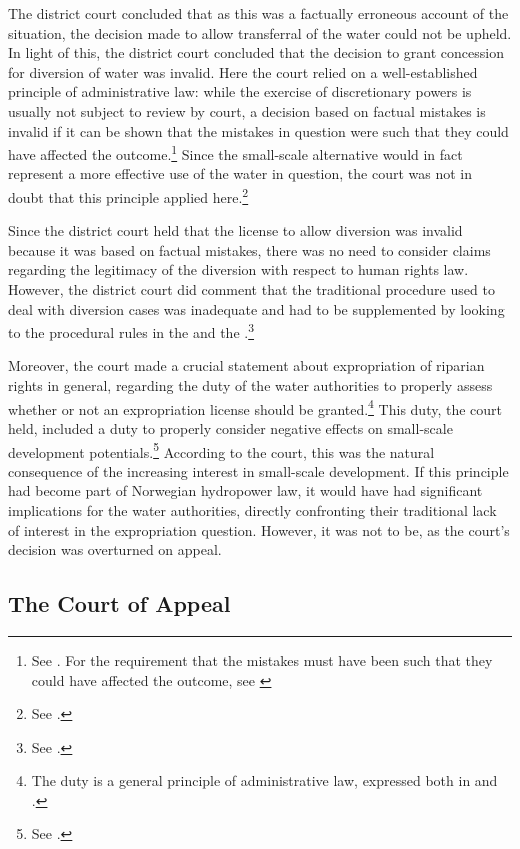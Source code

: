 The district court concluded that as this was a factually erroneous account of the situation, the decision made to allow transferral of the water could not be upheld. In light of this, the district court concluded that the decision to grant concession for diversion of water was invalid. Here the court relied on a well-established principle of administrative law: while the exercise of discretionary powers is usually not subject to review by court, a decision based on factual mistakes is invalid if it can be shown that the mistakes in question were such that they could have affected the outcome.\footnote{See \cite[407-410]{eckhoff14}. For the requirement that the mistakes must have been such that they could have affected the outcome, see \cite[41]{paa67}} Since the small-scale alternative would in fact represent a more effective use of the water in question, the court was not in doubt that this principle applied here.\footnote{See \cite[25]{jorpeland09}.}

Since the district court held that the license to allow diversion was invalid because it was based on factual mistakes, there was no need to consider claims regarding the legitimacy of the diversion with respect to human rights law. However, the district court did comment that the traditional procedure used to deal with diversion cases was inadequate and had to be supplemented by looking to the procedural rules in the \cite{ea59} and the \cite{paa67}.\footnote{See \cite[21]{jorpeland09}.} 

Moreover, the court made a crucial statement about expropriation of riparian rights in general, regarding the duty of the water authorities to properly assess whether or not an expropriation license should be granted.\footnote{The duty is a general principle of administrative law, expressed both in \cite[12]{ea59} and \cite[16]{paa67}.} This duty, the court held, included a duty to properly consider negative effects on small-scale development potentials.\footnote{See \cite[22]{jorpeland09}.} According to the court, this was the natural consequence of the increasing interest in small-scale development. If this principle had become part of Norwegian hydropower law, it would have had significant implications for the water authorities, directly confronting their traditional lack of interest in the expropriation question. However, it was not to be, as the court's decision was overturned on appeal.

\subsection{The Court of Appeal}


